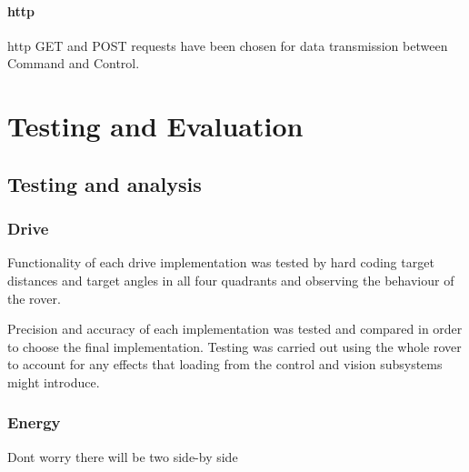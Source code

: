 \documentclass[10pt,twoside]{article}
\begin{document}
\paragraph{http} http GET and POST requests have been chosen for data transmission between Command and Control.



\newpage


\section{Testing and Evaluation}
\subsection{Testing and analysis}

\subsubsection{Drive}

Functionality of each drive implementation was tested by hard coding target distances and target angles in all four quadrants and observing the behaviour of the rover.

Precision and accuracy of each implementation was tested and compared in order to choose the final implementation. Testing was carried out using the whole rover to account for any effects that loading from the control and vision subsystems might introduce.









\subsubsection{Energy}

Dont worry there will be two side-by side
\end{document}
